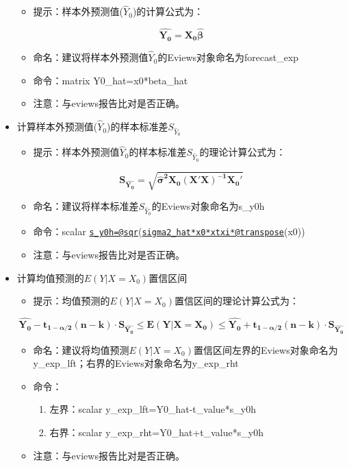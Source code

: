 \documentclass[12pt,(landscape,a4paper),(portrait,a4paper)]{article}
\providecommand{\tightlist}{%
  \setlength{\itemsep}{0pt}\setlength{\parskip}{0pt}}
\begin{document}
\begin{itemize}
  \begin{itemize}
  \tightlist
  \item
    提示：样本外预测值(\(\hat{Y}_0\))的计算公式为：
  \end{itemize}

  \[\mathbf{\hat{Y_0}=X_0\hat{\beta}}\]

  \begin{itemize}
  \item
    命名：建议将样本外预测值\(\hat{Y}_0\)的Eviews对象命名为forecast\_exp
  \item
    命令：matrix Y0\_hat=x0*beta\_hat
  \item
    注意：与eviews报告比对是否正确。
  \end{itemize}
\item
  计算样本外预测值(\(\hat{Y}_0\))的样本标准差\(S_{\hat{Y}_0}\)

  \begin{itemize}
  \tightlist
  \item
    提示：样本外预测值\(\hat{Y}_0\)的样本标准差\(S_{\hat{Y}_0}\)的理论计算公式为：
  \end{itemize}

  \[\mathbf{S_{\hat{Y_0}}= \sqrt{\hat{\sigma}^2X_0(X'X)^{-1}X_0'}}\]

  \begin{itemize}
  \item
    命名：建议将样本标准差\(S_{\hat{Y}_0}\)的Eviews对象命名为s\_y0h
  \item
    命令：scalar
    \href{mailto:s_y0h=@sqr}{\nolinkurl{s\_y0h=@sqr}}(\href{mailto:sigma2_hat*x0*xtxi*@transpose}{\nolinkurl{sigma2\_hat*x0*xtxi*@transpose}}(x0))
  \item
    注意：与eviews报告比对是否正确。
  \end{itemize}
\item
  计算均值预测的\(E(Y|X=X_0)\)置信区间

  \begin{itemize}
  \tightlist
  \item
    提示：均值预测的\(E(Y|X=X_0)\)置信区间的理论计算公式为：
  \end{itemize}

  \[\mathbf{\hat{Y_0}-t_{1-\alpha/2}(n-k)\cdot S_{\hat{Y_0}}\leq {E(Y|X=X_0)}\leq \hat{Y_0}+t_{1-\alpha/2}(n-k)\cdot S_{\hat{Y_0}}}\]

  \begin{itemize}
  \tightlist
  \item
    命名：建议将均值预测\(E(Y|X=X_0)\)置信区间左界的Eviews对象命名为y\_exp\_lft；右界的Eviews对象命名为y\_exp\_rht
  \item
    命令：

    \begin{enumerate}
    \def\labelenumi{\alph{enumi}.}
    \tightlist
    \item
      左界：scalar y\_exp\_lft=Y0\_hat-t\_value*s\_y0h
    \item
      右界：scalar y\_exp\_rht=Y0\_hat+t\_value*s\_y0h
    \end{enumerate}
  \item
    注意：与eviews报告比对是否正确。
  \end{itemize}
\end{itemize}
\end{document}
